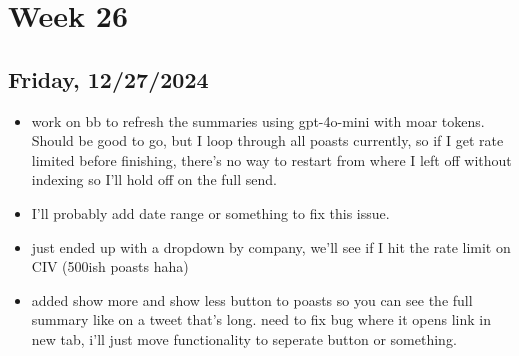 \newpage
\section{Week 26}

\subsection{Friday, 12/27/2024}
\begin{itemize}
    \item work on bb to refresh the summaries using gpt-4o-mini with moar
        tokens. Should be good to go, but I loop through all poasts currently,
        so if I get rate limited before finishing, there's no way to restart
        from where I left off without indexing so I'll hold off on the full
        send.
    \item I'll probably add date range or something to fix this issue.
    \item just ended up with a dropdown by company, we'll see if I hit the rate
        limit on CIV (500ish poasts haha)
    \item added show more and show less button to poasts so you can see the full
        summary like on a tweet that's long. need to fix bug where it opens link
        in new tab, i'll just move functionality to seperate button or
        something.
\end{itemize}
